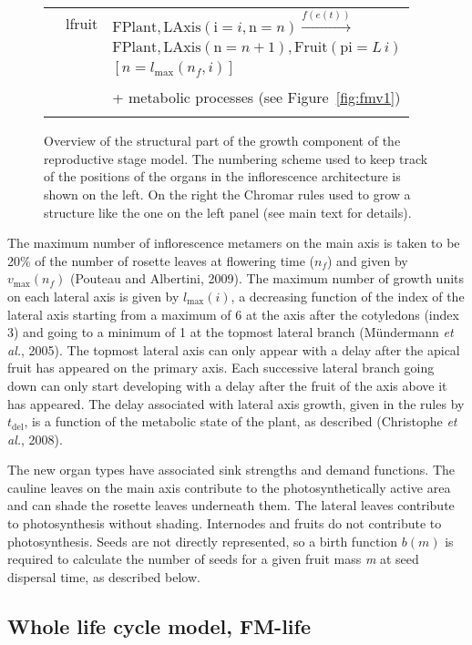 \documentclass[phd]{infthesis}
\newcommand{\mr}[1]{\mathrm{#1}}
\newcommand{\ar}[2]{\mr{#1} \! = \! {#2}}
\begin{document}
\begin{figure}[p]
{\begin{tabularx}{1.05\textwidth}{c|ll}
& \textsf{lfruit} & $\mathrm{FPlant}, \mathrm{LAxis}(\ar{i}{i}, \ar{n}{n}) \xrightarrow{f(e(t))}$ \\
& & $\mathrm{FPlant}, \mathrm{LAxis}(\ar{n}{n+1}), \mathrm{Fruit}(\ar{pi}{L \, i})$ \\
& & $[n = l_{\mathrm{max}}(n_f, i)]$ \\
& & \\
& & + metabolic processes (see Figure~\ref{fig:fmv1}) \\
\addlinespace[0.25cm]
\bottomrule
\end{tabularx}}
\caption{Overview of the structural part of the growth component of the
reproductive stage model. The numbering scheme used to keep track of the
positions of the organs in the inflorescence architecture is shown on
the left. On the right the Chromar rules used to grow a structure like
the one on the left panel (see main text for details).}
\label{fig:reprModel}
\end{figure}

The maximum number of inflorescence metamers on the main axis is taken
to be 20\% of the number of rosette leaves at flowering time (\(n_{f}\))
and given by \(v_{\max}(n_{f})\) (Pouteau and Albertini, 2009). The
maximum number of growth units on each lateral axis is given by
\(l_{\max}(i)\), a decreasing function of the index of the lateral axis
starting from a maximum of 6 at the axis after the cotyledons (index 3)
and going to a minimum of 1 at the topmost lateral branch (Mündermann
\emph{et al.}, 2005). The topmost lateral axis can only appear with a
delay after the apical fruit has appeared on the primary axis. Each
successive lateral branch going down can only start developing with a
delay after the fruit of the axis above it has appeared. The delay
associated with lateral axis growth, given in the rules by
\(t_{\mr{del}}\), is a function of the metabolic state of the plant,
as described (Christophe \emph{et al.}, 2008).

The new organ types have associated sink strengths and demand functions.
The cauline leaves on the main axis contribute to the photosynthetically
active area and can shade the rosette leaves underneath them. The
lateral leaves contribute to photosynthesis without shading. Internodes
and fruits do not contribute to photosynthesis. Seeds are not directly
represented, so a birth function \(b(m)\) is required to calculate the
number of seeds for a given fruit mass \emph{m} at seed dispersal time,
as described below.

\subsection{Whole life cycle model,
  FM-life}
\label{whole-life-cycle-model-fm-life}
\end{document}
